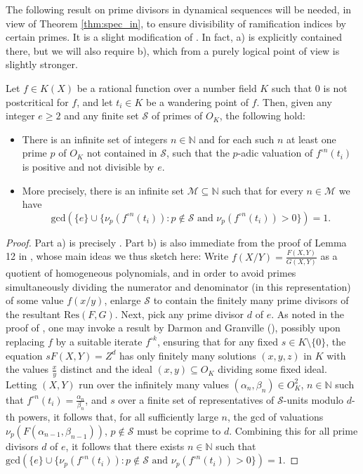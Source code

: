 \documentclass[a4paper]{amsart}
\begin{document}
  The following result on prime divisors in dynamical sequences will be needed,  in view of Theorem \ref{thm:spec_in}, to ensure divisibility of ramification indices by certain primes. It is a slight modification of \cite[Lemma 12]{Betal}. In fact, a) is explicitly contained there, but we will also require b), which from a purely logical point of view is slightly stronger.
  \begin{lemma}
  \label{lem:betal}
  Let $f\in K(X)$ be a rational function over a number field $K$ such that $0$ is not postcritical for $f$, and let $t_i\in K$ be a wandering point of $f$. Then, given any integer $e\ge 2$ and any finite set $\mathcal{S}$ of primes of $O_K$, the following hold:
  \begin{itemize}
  \item[a)] There is an infinite set of integers $n\in \mathbb{N}$ and for each such $n$ at least one prime $p$ of $O_K$ not contained in $\mathcal{S}$, such that the $p$-adic valuation of $f^{\circ n}(t_i)$ is positive and not divisible by $e$.
  \item[b)] More precisely, there is an infinite set $\mathcal{M}\subseteq \mathbb N$ such that for every $n\in \mathcal{M}$ we have $$\mathrm{gcd}(\{e\}\cup \{\nu_p(f^{\circ n}(t_i)): p\notin \mathcal{S} \text{ and } \nu_p(f^{\circ n}(t_i)) > 0\}) = 1.$$  \end{itemize}\end{lemma}
  \begin{proof}
 Part a) 
 is precisely \cite[Lemma 12]{Betal}.
 Part b) %
 is also immediate from the proof of Lemma 12 in \cite{Betal}, whose main ideas we thus sketch here: Write $f(X/Y)=\frac{F(X,Y)}{G(X,Y)}$ as a quotient of homogeneous polynomials, and 
 in order to avoid primes simultaneously dividing the numerator and denominator (in this representation) of some value $f(x/y)$, enlarge $\mathcal{S}$ to contain the finitely many prime divisors of the resultant $\textrm{Res}(F,G)$. Next, pick any prime divisor $d$ of $e$. 
 As noted in the proof of \cite[Lemma 12]{Betal}, one may invoke a result by Darmon and Granville (\cite[Theorem 1]{DG}), possibly upon replacing $f$ by a suitable iterate $f^{\circ k}$, ensuring that for any fixed $s\in K\setminus\{0\}$, the equation $sF(X,Y)=Z^d$ has only finitely many solutions $(x,y,z)$ in $K$ with the values $\frac{x}{y}$ distinct and the ideal $(x,y)\subseteq O_K$ dividing some fixed ideal. 
 Letting $(X,Y)$ run over the infinitely many values $(\alpha_n,\beta_n)\in O_K^2$, $n\in \mathbb{N}$ such that $f^{\circ n}(t_i) = \frac{\alpha_n}{\beta_n}$, and $s$ over a finite set of representatives of $\mathcal{S}$-units modulo $d$-th powers, it follows that, for all sufficiently large $n$, the $\mathrm{gcd}$ of valuations $\nu_p(F(\alpha_{n-1}, \beta_{n-1}))$, $p\notin \mathcal{S}$ must be coprime to $d$.  Combining this for all prime divisors $d$ of $e$, it follows that there exists $n\in \mathbb{N}$ such that $\mathrm{gcd}(\{e\}\cup \{\nu_p(f^{\circ n}(t_i)): p\notin \mathcal{S} \text{ and } \nu_p(f^{\circ n}(t_i)) > 0\}) = 1$.
 \end{proof}
\end{document}

